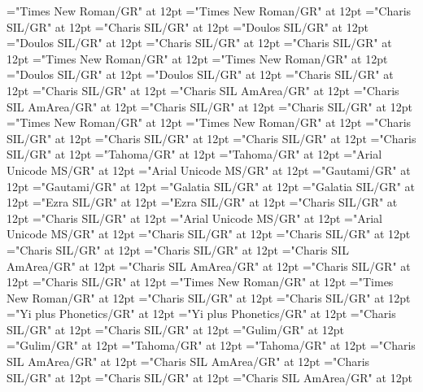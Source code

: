 \documentclass[a4paper,twoside]{article}
\begin{document}
\pagestyle{plain}
\sloppy
\setlength{\parfillskip}{0pt plus 1fil}
\font\divarIQ="Times New Roman/GR" at 12pt
\font\spanarIQ="Times New Roman/GR" at 12pt
\font\divbn="Charis SIL/GR" at 12pt
\font\spanbn="Charis SIL/GR" at 12pt
\font\divbzhfonipa="Doulos SIL/GR" at 12pt
\font\spanbzhfonipa="Doulos SIL/GR" at 12pt
\font\divbzh="Charis SIL/GR" at 12pt
\font\spanbzh="Charis SIL/GR" at 12pt
\font\divde="Times New Roman/GR" at 12pt
\font\spande="Times New Roman/GR" at 12pt
\font\divenfonipa="Doulos SIL/GR" at 12pt
\font\spanenfonipa="Doulos SIL/GR" at 12pt
\font\diven="Charis SIL/GR" at 12pt
\font\spanen="Charis SIL/GR" at 12pt
\font\divesaab="Charis SIL AmArea/GR" at 12pt
\font\spanesaab="Charis SIL AmArea/GR" at 12pt
\font\dives="Charis SIL/GR" at 12pt
\font\spanes="Charis SIL/GR" at 12pt
\font\divfa="Times New Roman/GR" at 12pt
\font\spanfa="Times New Roman/GR" at 12pt
\font\divfrZxxxxaudio="Charis SIL/GR" at 12pt
\font\spanfrZxxxxaudio="Charis SIL/GR" at 12pt
\font\divfr="Charis SIL/GR" at 12pt
\font\spanfr="Charis SIL/GR" at 12pt
\font\divggofonipaxemic="Tahoma/GR" at 12pt
\font\spanggofonipaxemic="Tahoma/GR" at 12pt
\font\divggoINxaheri="Arial Unicode MS/GR" at 12pt
\font\spanggoINxaheri="Arial Unicode MS/GR" at 12pt
\font\divggoTeluIN="Gautami/GR" at 12pt
\font\spanggoTeluIN="Gautami/GR" at 12pt
\font\divgrc="Galatia SIL/GR" at 12pt
\font\spangrc="Galatia SIL/GR" at 12pt
\font\divhbo="Ezra SIL/GR" at 12pt
\font\spanhbo="Ezra SIL/GR" at 12pt
\font\divhe="Charis SIL/GR" at 12pt
\font\spanhe="Charis SIL/GR" at 12pt
\font\divhi="Arial Unicode MS/GR" at 12pt
\font\spanhi="Arial Unicode MS/GR" at 12pt
\font\divhu="Charis SIL/GR" at 12pt
\font\spanhu="Charis SIL/GR" at 12pt
\font\divibafonipa="Charis SIL/GR" at 12pt
\font\spanibafonipa="Charis SIL/GR" at 12pt
\font\diviba="Charis SIL AmArea/GR" at 12pt
\font\spaniba="Charis SIL AmArea/GR" at 12pt
\font\dividZxxxxaudio="Charis SIL/GR" at 12pt
\font\spanidZxxxxaudio="Charis SIL/GR" at 12pt
\font\divid="Times New Roman/GR" at 12pt
\font\spanid="Times New Roman/GR" at 12pt
\font\diviixpin="Charis SIL/GR" at 12pt
\font\spaniixpin="Charis SIL/GR" at 12pt
\font\divii="Yi plus Phonetics/GR" at 12pt
\font\spanii="Yi plus Phonetics/GR" at 12pt
\font\divkm="Charis SIL/GR" at 12pt
\font\spankm="Charis SIL/GR" at 12pt
\font\divko="Gulim/GR" at 12pt
\font\spanko="Gulim/GR" at 12pt
\font\divlv="Tahoma/GR" at 12pt
\font\spanlv="Tahoma/GR" at 12pt
\font\divmiz="Charis SIL AmArea/GR" at 12pt
\font\spanmiz="Charis SIL AmArea/GR" at 12pt
\font\divms="Charis SIL/GR" at 12pt
\font\spanms="Charis SIL/GR" at 12pt
\font\divmxbfonipa="Charis SIL AmArea/GR" at 12pt
\end{document}
